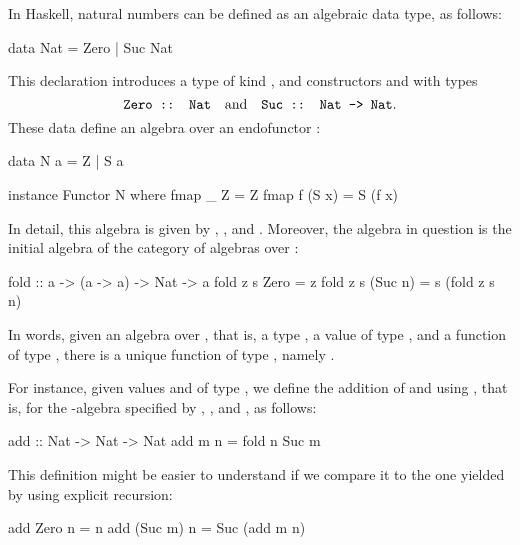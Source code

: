 \begin{example}%
  \label{ex:algebra-natural-numbers-haskell}

  In Haskell, natural numbers can be defined as an algebraic data
  type, as follows:
  \begin{codehaskell}
data Nat = Zero | Suc Nat
  \end{codehaskell}
  This declaration introduces a type  of kind
  \texthaskell{*}, and constructors  and
   with types
  \begin{equation*}
    \text{\texttt{Zero :: Nat}}
    \quad
    \text{and}
    \quad
    \text{\texttt{Suc :: Nat -> Nat}}
    \text{.}
  \end{equation*}
  These data define an algebra over an endofunctor :
  \begin{codehaskell}
data N a = Z | S a

instance Functor N where
  fmap _ Z     = Z
  fmap f (S x) = S (f x)
\end{codehaskell}
  In detail, this algebra is given by ,
  , and . Moreover, the algebra in
  question is the initial algebra of the category of algebras over
  :
  \begin{codehaskell}
fold :: a -> (a -> a) -> Nat -> a
fold z s Zero    = z
fold z s (Suc n) = s (fold z s n)
  \end{codehaskell}
  In words, given an algebra over , that is, a type
  , a value  of type ,
  and a function  of type , there
  is a unique function of type , namely
  .

  For instance, given values  and  of
  type , we define the addition of 
  and  using , that is,
   for the -algebra specified by
  , , and , as
  follows:
  \begin{codehaskell}
add :: Nat -> Nat -> Nat
add m n = fold n Suc m
  \end{codehaskell}
  This definition might be easier to understand if we compare it to
  the one yielded by using explicit recursion:
  \begin{codehaskell}
add Zero    n = n
add (Suc m) n = Suc (add m n)
  \end{codehaskell}


\end{example}
